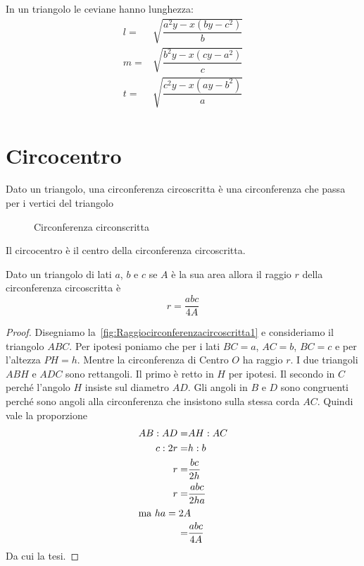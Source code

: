 \begin{cor}\label{cor:ceviana1}
In un triangolo le ceviane hanno lunghezza:
\begin{align*}
l=&\sqrt{\dfrac{a^2y-x(by-c^2)}{b}}\\
m=&\sqrt{\dfrac{b^2y-x(cy-a^2)}{c}}\\
t=&\sqrt{\dfrac{c^2y-x(ay-b^2)}{a}}\\
\end{align*}
\end{cor}
\section{Circocentro}\label{sec:circocentro}
\begin{defn}\label{defn:CircCirc1}
Dato un triangolo, una circonferenza circoscritta è una circonferenza che passa per i vertici del triangolo
\end{defn}
\begin{figure}
	\centering

	\caption{Circonferenza circonscritta}
	\label{fig:circumcerchio}
\end{figure}
\begin{defn}[Circocentro]\label{defn:Circocentro1}
Il circocentro è il centro della circonferenza circoscritta. 
\end{defn}
\begin{thm}\label{thm:Raggiocirconferenzacircoscritta1}
	Dato un triangolo di lati $a$, $b$ e $c$ se $A$ è la sua area allora il raggio $r$ della circonferenza circoscritta è \[r=\dfrac{abc}{4A}\]
\end{thm}
\begin{proof}
	Disegniamo la~\vref{fig:Raggiocirconferenzacircoscritta1} e consideriamo il triangolo $ABC$. Per ipotesi poniamo che per i lati $BC=a$, $AC=b$, $BC=c$ e per l'altezza $PH=h$. Mentre la circonferenza di Centro $O$ ha raggio $r$.
	I due triangoli $ABH$ e $ADC$  sono rettangoli. Il primo è retto in $H$ per ipotesi. Il secondo in $C$ perché l'angolo $H$ insiste sul diametro $AD$. Gli angoli in $B$ e $D$ sono congruenti perché sono angoli alla circonferenza che insistono sulla stessa corda $AC$. Quindi vale la proporzione
	\begin{align*}
	AB:AD=&AH:AC\\
	c:2r=&h:b\\
	r=&\dfrac{bc}{2h}\\
	r=&\dfrac{abc}{2ha}\\
	\intertext{ma $ha=2A$}
	=&\dfrac{abc}{4A}
	\end{align*}
	Da cui la tesi.
\end{proof}
